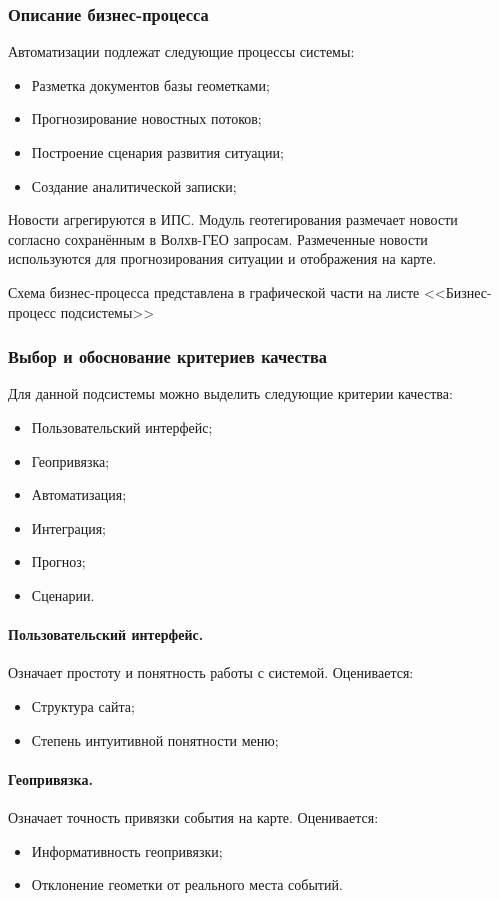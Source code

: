 \subsubsection{Описание бизнес-процесса}
Автоматизации подлежат следующие процессы системы:
\begin{itemize}
\item Разметка документов базы геометками;
\item Прогнозирование новостных потоков;
\item Построение сценария развития ситуации;
\item Создание аналитической записки;
\end{itemize}

Новости агрегируются в ИПС. Модуль геотегирования размечает новости согласно сохранённым в Волхв-ГЕО запросам. Размеченные новости используются для прогнозирования ситуации и отображения на карте.

Схема бизнес-процесса представлена в графической части на листе <<Бизнес-процесс подсистемы>>



\subsubsection{Выбор и обоснование критериев качества}

Для данной подсистемы можно выделить следующие критерии качества:
\begin{itemize}
\item Пользовательский интерфейс;
\item Геопривязка;
\item Автоматизация;
\item Интеграция;
\item Прогноз;
\item Сценарии.
\end{itemize}

\paragraph{Пользовательский интерфейс.}
Означает простоту и понятность работы с системой. Оценивается:
\begin{itemize}
\item Структура сайта;
\item Степень интуитивной понятности меню;
\end{itemize}

\paragraph{Геопривязка.}
Означает точность привязки события на карте. Оценивается:
\begin{itemize}
\item Информативность геопривязки;
\item Отклонение геометки от реального места событий.
\end{itemize}

